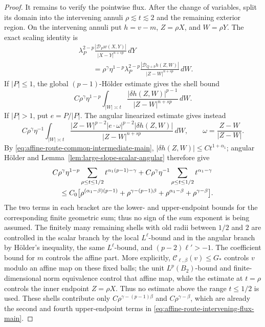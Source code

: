 \documentclass[11pt,reqno]{amsart}
\numberwithin{equation}{section}
\newcommand{\dd}{\,d}
\theoremstyle{remark}
\begin{document}
\begin{proof}
It remains to verify the pointwise flux.  After the change of variables,
split its domain into the intervening annuli
\(\rho\lesssim t\lesssim2\) and the remaining exterior region.  On the
intervening annuli put \(h=v-m\), \(Z=\rho X\), and \(W=\rho Y\).
The exact scaling identity is
\begin{equation}
 \begin{split}
 &\lambda_P^{2-p}
 \frac{|\mathcal D_Pw(X,Y)|}{|X-Y|^{n+sp}}\dd Y\\
 &\qquad=
 \rho^\gamma\eta^{1-p}\lambda_P^{2-p}
 \frac{|\mathcal D_{Q+b}h(Z,W)|}
 {|Z-W|^{n+sp}}\dd W .
 \end{split}
 \label{eq:affine-route-pointwise-flux-scaling}
\end{equation}
If \(|P|\le1\), the global \((p-1)\)-H\"older estimate gives the shell
bound
\begin{equation*}
 C\rho^\gamma\eta^{1-p}
 \int_{|W|\asymp t}
 \frac{|\delta h(Z,W)|^{p-1}}{|Z-W|^{n+sp}}\dd W.
\end{equation*}
If \(|P|>1\), put \(e=P/|P|\).  The angular linearized estimate gives
instead
\begin{equation*}
 C\rho^\gamma\eta^{-1}
 \int_{|W|\asymp t}
 \frac{|Z-W|^{p-2}|e\cdot\omega|^{p-2}
       |\delta h(Z,W)|}
 {|Z-W|^{n+sp}}\dd W,
 \qquad \omega=\frac{Z-W}{|Z-W|}.
\end{equation*}
By \eqref{eq:affine-route-common-intermediate-main},
\(|\delta h(Z,W)|\le Ct^{1+\alpha_1}\); angular H\"older and
Lemma~\ref{lem:large-slope-scalar-angular} therefore give
\begin{align}
 &C\rho^\gamma\eta^{1-p}
   \sum_{\rho\le t\le1/2}t^{\alpha_1(p-1)-\gamma}
 +C\rho^\gamma\eta^{-1}
   \sum_{\rho\le t\le1/2}t^{\alpha_1-\gamma}
 \notag\\
 &\quad\le C_0\bigl[
 \rho^{(\alpha_1-\beta)(p-1)}
 +\rho^{\gamma-(p-1)\beta}
 +\rho^{\alpha_1-\beta}
 +\rho^{\gamma-\beta}\bigr].
 \label{eq:affine-route-intervening-flux-main}
\end{align}
The two terms in each bracket are the lower- and upper-endpoint bounds
for the corresponding finite geometric sum; thus no sign of the sum
exponent is being assumed.  The finitely many remaining shells with
old radii between \(1/2\) and \(2\) are controlled in the scalar
branch by the local \(L^\ell\)-bound and in the angular branch by
H\"older's inequality, the same \(L^\ell\)-bound, and
\((p-2)\ell'>-1\).  The coefficient bound for \(m\) controls the
affine part.  More explicitly,
\(\mathscr C_{\ell,\beta}(v)\le G_*\) controls \(v\) modulo an affine
map on these fixed balls; the unit \(L^p(B_2)\)-bound and
finite-dimensional norm equivalence control that affine map, while the
estimate at \(t=\rho\) controls the inner endpoint \(Z=\rho X\).
Thus no estimate above the range \(t\le1/2\) is used.  These shells
contribute only
\(C\rho^{\gamma-(p-1)\beta}\) and
\(C\rho^{\gamma-\beta}\), which are already the second and fourth
upper-endpoint terms in \eqref{eq:affine-route-intervening-flux-main}.


\end{proof}
\end{document}
